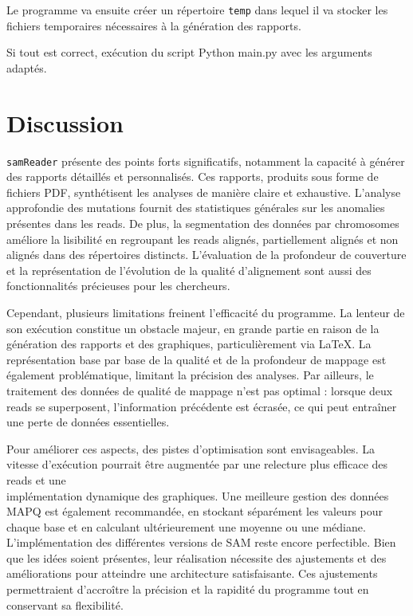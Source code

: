 \documentclass[11pt]{article}
\begin{document}
Le programme va ensuite créer un répertoire \texttt{temp} dans lequel il va stocker les fichiers temporaires nécessaires à la génération des rapports.


\noindent Si tout est correct, exécution du script Python main.py avec les arguments adaptés.


\section{Discussion}\label{sec:discussion}

\texttt{samReader} présente des points forts significatifs, notamment la capacité à générer des rapports détaillés et personnalisés.
Ces rapports, produits sous forme de fichiers PDF, synthétisent les analyses de manière claire et exhaustive.
L’analyse approfondie des mutations fournit des statistiques générales sur les anomalies présentes dans les reads.
De plus, la segmentation des données par chromosomes améliore la lisibilité en regroupant les reads alignés, partiellement alignés et non alignés dans des répertoires distincts.
L’évaluation de la profondeur de couverture et la représentation de l’évolution de la qualité d’alignement sont aussi des fonctionnalités précieuses pour les chercheurs.


Cependant, plusieurs limitations freinent l’efficacité du programme.
La lenteur de son exécution constitue un obstacle majeur, en grande partie en raison de la génération des rapports et des graphiques, particulièrement via \LaTeX.
La représentation base par base de la qualité et de la profondeur de mappage est également problématique, limitant la précision des analyses.
Par ailleurs, le traitement des données de qualité de mappage n’est pas optimal : lorsque deux reads se superposent, l’information précédente est écrasée, ce qui peut entraîner une perte de données essentielles.


Pour améliorer ces aspects, des pistes d’optimisation sont envisageables.
La vitesse d’exécution pourrait être augmentée par une relecture plus efficace des reads et une \\ implémentation dynamique des graphiques.
Une meilleure gestion des données MAPQ est également recommandée, en stockant séparément les valeurs pour chaque base et en calculant ultérieurement une moyenne ou une médiane.
L'implémentation des différentes versions de SAM reste encore perfectible.
Bien que les idées soient présentes, leur réalisation nécessite des ajustements et des améliorations pour atteindre une architecture satisfaisante.
Ces ajustements permettraient d’accroître la précision et la rapidité du programme tout en conservant sa flexibilité.

\printbibliography
\end{document}
